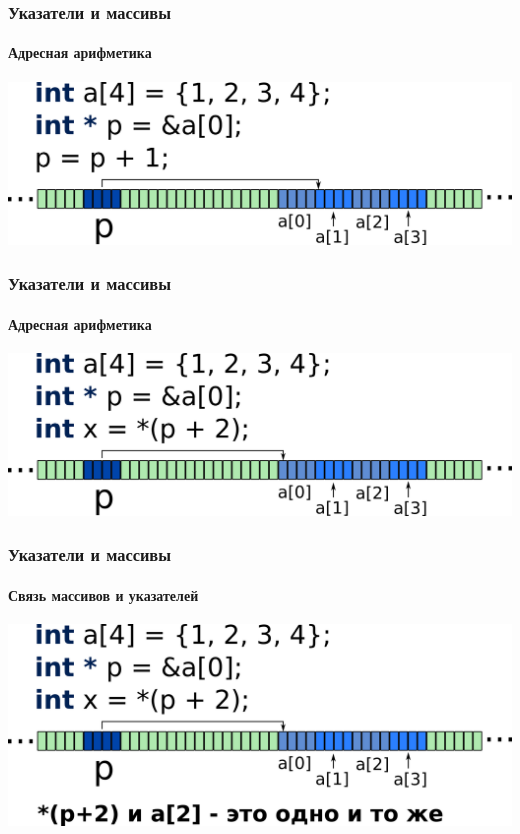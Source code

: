 \documentclass[12pt,pdf,hyperref={unicode}]{beamer}
\begin{document}
\begin{frame}[fragile]
\frametitle{Указатели и массивы} 
\framesubtitle{Адресная арифметика}
\begin{center}
\includegraphics[width=0.95\linewidth]{images/memory_parrays_2.png}
\end{center}
\end{frame}

\begin{frame}[fragile]
\frametitle{Указатели и массивы} 
\framesubtitle{Адресная арифметика}
\begin{center}
\includegraphics[width=0.95\linewidth]{images/memory_parrays_3.png}
\end{center}
\end{frame}

\begin{frame}[fragile]
\frametitle{Указатели и массивы} 
\framesubtitle{Связь массивов и указателей}
\begin{center}
\includegraphics[width=0.95\linewidth]{images/memory_parrays_4.png}
\end{center}
\end{frame}
\end{document}
